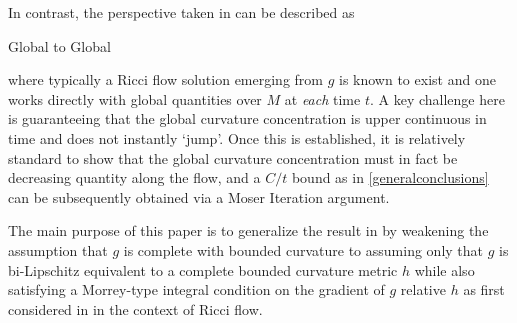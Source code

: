 \documentclass{amsart}
\theoremstyle{definition}
\begin{document}
    In contrast, the perspective taken in  \cite{ChenEric, ChauMartens} can be described as \begin{it} Global to Global \end{it} where typically a Ricci flow solution emerging from $g$ is known to exist and one works directly with global quantities over $M$ at \textit{each} time $t$.    A key challenge here is guaranteeing that the global curvature concentration is upper continuous in time and does not instantly `jump'.  Once this is established, it is relatively standard to show that the global curvature concentration must in fact be decreasing quantity along the flow, and a $C/t$ bound as in \eqref{generalconclusions} can be subsequently obtained via a Moser Iteration argument. 
 

 
  The main purpose of this paper is to generalize the result in \cite{ChauMartens} by weakening the assumption that $g$ is complete with bounded curvature to assuming only that $g$ is bi-Lipschitz equivalent to a complete bounded curvature metric $h$ while also satisfying a Morrey-type integral condition on the gradient of $g$ relative $h$ as first considered in \cite{LeeLiu} in the context of Ricci flow.

 
 
 
\end{document}
